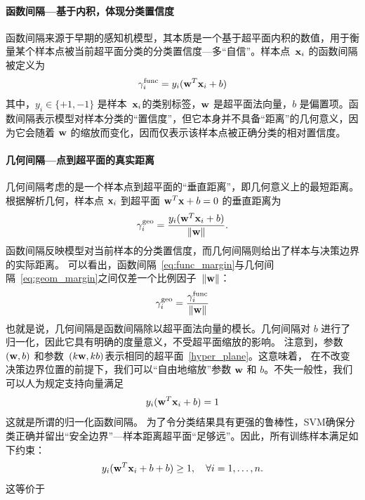 \paragraph*{函数间隔---基于内积，体现分类置信度}
函数间隔来源于早期的感知机模型，其本质是一个基于超平面内积的数值，用于衡量某个样本点被当前超平面分类的分类置信度---多“自信”。样本点~${\bf x}_i$ 的函数间隔被定义为
\begin{equation}\label{eq:func_margin}
\gamma_i^{\text{func}} = y_i({\bf w}^T {\bf x}_i + b )
\end{equation}
其中，$y_i \in \{+1, -1\}$ 是样本~${\bf x}_i$的类别标签，${\bf w}$ 是超平面法向量，$b$ 是偏置项。函数间隔表示模型对样本分类的“置信度”，但它本身并不具备“距离”的几何意义，因为它会随着 ${\bf w}$ 的缩放而变化，因而仅表示该样本点被正确分类的相对置信度。
\paragraph*{ 几何间隔---点到超平面的真实距离}
几何间隔考虑的是一个样本点到超平面的“垂直距离”，即几何意义上的最短距离。
根据解析几何，样本点 ${\bf x}_i$ 到超平面 ${\bf w}^T {\bf x} + b  = 0$ 的垂直距离为
\begin{equation}\label{eq:geom_margin}
\gamma_i^{\rm geo} = \frac{y_i({\bf w}^T {\bf x}_i + b )}{\|{\bf w}\|}. %
\end{equation}
函数间隔反映模型对当前样本的分类置信度，而几何间隔则给出了样本与决策边界的实际距离。
可以看出，函数间隔~\eqref{eq:func_margin}与几何间隔~\eqref{eq:geom_margin}之间仅差一个比例因子~$\|{\bf w}\|$：
\[
\gamma_i^{\text{geo}} = \frac{\gamma_i^{\text{func}}}{\|{\bf w}\|}
\]
也就是说，几何间隔是函数间隔除以超平面法向量的模长。几何间隔对 $b$ 进行了归一化，因此它具有明确的度量意义，不受超平面缩放的影响。
注意到，参数~$({\bf w},b)$ 和参数~$(k{\bf w},kb)$表示相同的超平面~\eqref{hyper_plane}。这意味着， 在不改变决策边界位置的前提下，我们可以“自由地缩放”参数 ${\bf w}$ 和 $b$。不失一般性，我们可以人为规定支持向量满足
$$
y_i({\bf w}^T {\bf x}_i + b) = 1
$$
这就是所谓的归一化函数间隔。
为了令分类结果具有更强的鲁棒性，SVM确保分类正确并留出“安全边界”---样本距离超平面“足够远”。因此，所有训练样本满足如下约束：
\begin{equation*}
y_i ({\bf w}^T {\bf x}_i + b+ b ) \geq 1, \quad \forall i = 1, \dots, n.
\end{equation*}
这等价于

